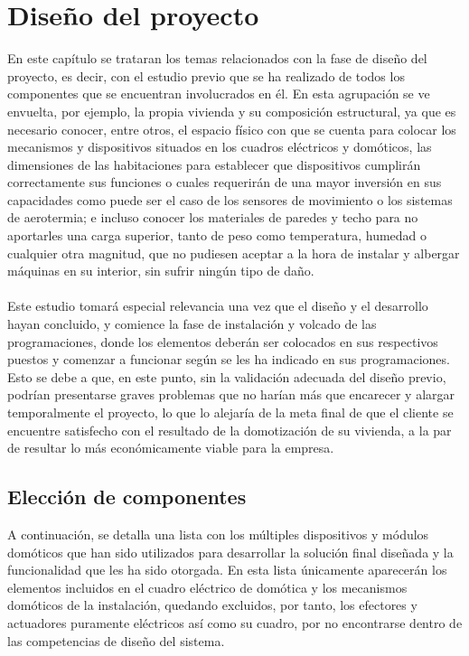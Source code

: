 \chapter{Diseño del proyecto}

En este capítulo se trataran los temas relacionados con la fase de diseño del proyecto, es decir, con el estudio previo que se ha realizado de todos los componentes que se encuentran involucrados en él. En esta agrupación se ve envuelta, por ejemplo, la propia vivienda y su composición estructural, ya que es necesario conocer, entre otros, el espacio físico con que se cuenta para colocar los mecanismos y dispositivos situados en los cuadros eléctricos y domóticos, las dimensiones de las habitaciones para establecer que dispositivos cumplirán correctamente sus funciones o cuales requerirán de una mayor inversión en sus capacidades como puede ser el caso de los sensores de movimiento o los sistemas de aerotermia; e incluso conocer los materiales de paredes y techo para no aportarles una carga superior, tanto de peso como temperatura, humedad o cualquier otra magnitud, que no pudiesen aceptar a la hora de instalar y albergar máquinas en su interior, sin sufrir ningún tipo de daño.\\\\
Este estudio tomará especial relevancia una vez que el diseño y el desarrollo hayan concluido, y comience la fase de instalación y volcado de las programaciones, donde los elementos deberán ser colocados en sus respectivos puestos y comenzar a funcionar según se les ha indicado en sus programaciones. Esto se debe a que, en este punto, sin la validación adecuada del diseño previo, podrían presentarse graves problemas que no harían más que encarecer y alargar temporalmente el proyecto, lo que lo alejaría de la meta final de que el cliente se encuentre satisfecho con el resultado de la domotización de su vivienda, a la par de resultar lo más económicamente viable para la empresa.

\section{Elección de componentes}

A continuación, se detalla una lista con los múltiples dispositivos y módulos domóticos que han sido utilizados para desarrollar la solución final diseñada y la funcionalidad que les ha sido otorgada. En esta lista únicamente aparecerán los elementos incluidos en el cuadro eléctrico de domótica y los mecanismos domóticos de la instalación, quedando excluidos, por tanto, los efectores y actuadores puramente eléctricos así como su cuadro, por no encontrarse dentro de las competencias de diseño del sistema.

